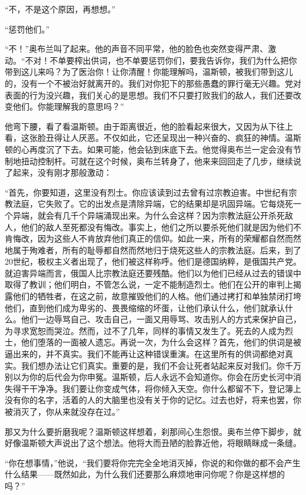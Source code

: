 ``不，不是这个原因，再想想。''

``惩罚他们。''

``不！''奥布兰叫了起来。他的声音不同平常，他的脸色也突然变得严肃、激动。``不对！不单要榨出供词，也不单要惩罚你们，要我告诉你，我们为什么把你带到这儿来吗？为了医治你！让你清醒！你能理解吗，温斯顿，被我们带到这儿的，没有一个不被治好就离开的。我们对你犯下的那些愚蠢的罪行毫无兴趣。党对表面的行为没兴趣，我们关心的是思想。我们不只要打败我们的敌人，我们还要改变他们。你能理解我的意思吗？''

他弯下腰，看了看温斯顿。由于距离很近，他的脸看起来很大，又因为从下往上看，这张脸丑得让人厌恶。不仅如此，它还呈现出一种兴奋的、疯狂的神情。温斯顿的心再度沉了下去。如果可能，他会钻到床底下去。他觉得奥布兰一定会没有节制地扭动控制杆。可就在这个时候，奥布兰转身了，他来来回回走了几步，继续说了起来，没有刚才那般激动：

``首先，你要知道，这里没有烈士。你应该读到过去曾有过宗教迫害。中世纪有宗教法庭，它失败了。它的出发点是清除异端，它的结果却是巩固异端。它每烧死一个异端，就会有几千个异端涌现出来。为什么会这样？因为宗教法庭公开杀死敌人，他们的敌人至死都没有悔改。事实上，他们之所以要杀死他们就是因为他们不肯悔改，因为这些人不肯放弃他们真正的信仰。如此一来，所有的荣耀都自然而然地属于殉难者，所有的耻辱都自然而然地归于烧死这些人的宗教法庭。后来，到了20世纪，极权主义者出现了，他们被这样称呼。他们是德国纳粹，是俄国共产党。就迫害异端而言，俄国人比宗教法庭还要残酷。他们以为他们已经从过去的错误中取得了教训；他们明白，不管怎么说，一定不能制造烈士。他们在公开的审判上揭露他们的牺牲者，在这之前，故意摧毁他们的人格。他们通过拷打和单独禁闭打垮他们，直到他们成为卑劣的、畏畏缩缩的坏蛋，让他们承认什么，他们就承认什么。他们一边辱骂自己、攻击自己，一面又用辱骂、攻击别人的方式来保护自己，为寻求宽恕而哭泣。然而，过不了几年，同样的事情又发生了。死去的人成为烈士，他们堕落的一面被人遗忘。再说一次，为什么会这样？首先，他们的供词是被逼出来的，并不真实。我们不能再让这种错误重演。在这里所有的供词都绝对真实。我们想办法让它们真实。重要的是，我们不会让死者站起来反对我们。你千万别以为你的后代会为你申冤。温斯顿，后人永远不会知道你。你会在历史长河中消失得干干净净。我们要让你变成气体，将你倾入天空。你什么都留不下，登记簿上没有你的名字，活着的人的大脑里也没有关于你的记忆。过去也好，将来也罢，你被消灭了，你从来就没存在过。''

那又为什么要折磨我呢？温斯顿这样想着，刹那间心生怨恨。奥布兰停下脚步，就好像温斯顿大声说出了这个想法。他将大而丑陋的脸靠近他，将眼睛眯成一条缝。

``你在想事情，''他说，``我们要将你完完全全地消灭掉，你说的和你做的都不会产生什么结果——既然如此，为什么我们还要那么麻烦地审问你呢？你是这样想的吗？''

